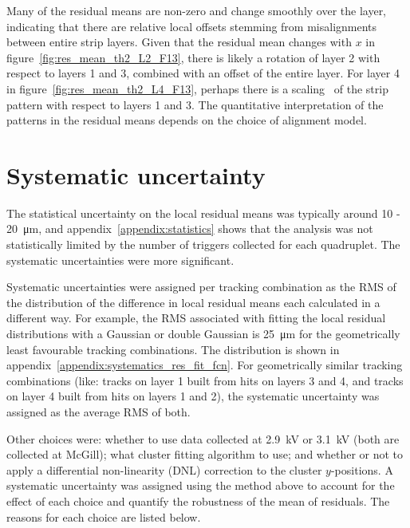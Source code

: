 Many of the residual means are non-zero and change smoothly over the layer, indicating that there are relative local offsets stemming from misalignments between entire strip layers. Given that the residual mean changes with $x$ in figure~\ref{fig:res_mean_th2_L2_F13}, there is likely a rotation of layer 2 with respect to layers 1 and 3, combined with an offset of the entire layer. For layer 4 in figure~\ref{fig:res_mean_th2_L4_F13}, perhaps there is a scaling~\cite{carlson_results_2019} of the strip pattern with respect to layers 1 and 3. The quantitative interpretation of the patterns in the residual means depends on the choice of alignment model.

\section{Systematic uncertainty}
\label{sec:cosmics_sys_uncerts}

The statistical uncertainty on the local residual means was typically around \SI{10}{} - \SI{20}{\micro\meter}, and appendix~\ref{appendix:statistics} shows that the analysis was not statistically limited by the number of triggers collected for each quadruplet. The systematic uncertainties were more significant. 

Systematic uncertainties were assigned per tracking combination as the RMS of the distribution of the difference in local residual means each calculated in a different way. For example, the RMS associated with fitting the local residual distributions with a Gaussian or double Gaussian is \SI{25}{\micro\meter} for the geometrically least favourable tracking combinations. The distribution is shown in appendix~\ref{appendix:systematics_res_fit_fcn}. For geometrically similar tracking combinations (like: tracks on layer 1 built from hits on layers 3 and 4, and tracks on layer 4 built from hits on layers 1 and 2), the systematic uncertainty was assigned as the average RMS of both.

Other choices were: whether to use data collected at 2.9~kV or 3.1~kV (both are collected at McGill); what cluster fitting algorithm to use; and whether or not to apply a differential non-linearity (DNL) correction to the cluster $y$-positions. A systematic uncertainty was assigned using the method above to account for the effect of each choice and quantify the robustness of the mean of residuals. The reasons for each choice are listed below.

